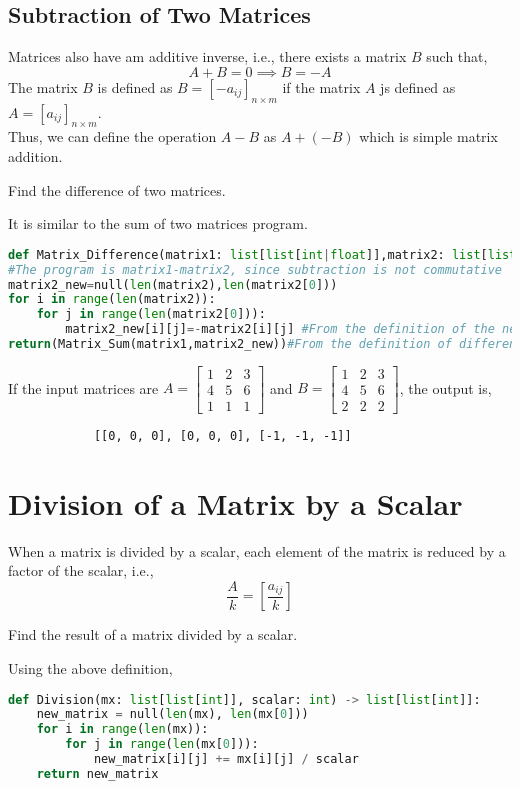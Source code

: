 \subsection{Subtraction of Two Matrices}
Matrices also have am additive inverse, i.e., there exists a matrix $B$ such that,
\[A+B=0\implies B=-A\]
The matrix $B$ is defined as $B=[-a_{ij}]_{n\times m}$ if the matrix $A$ js defined as $A=[a_{ij}]_{n\times m}$.\\
Thus, we can define the operation $A-B$ as $A+(-B)$ which is simple matrix addition.
\begin{eg}
	Find the difference of two matrices.
\end{eg}
\begin{explanation}
	It is similar to the sum of two matrices program.
	\begin{lstlisting}[language=Python, numbers=none]
def Matrix_Difference(matrix1: list[list[int|float]],matrix2: list[list[int|float]]) -> list[list[int|float]]:
#The program is matrix1-matrix2, since subtraction is not commutative
matrix2_new=null(len(matrix2),len(matrix2[0]))
for i in range(len(matrix2)):
	for j in range(len(matrix2[0])):
		matrix2_new[i][j]=-matrix2[i][j] #From the definition of the negative of a matrix
return(Matrix_Sum(matrix1,matrix2_new))#From the definition of difference of two matrices
		\end{lstlisting}
	If the input matrices are $A=\begin{bmatrix}
			1 & 2 & 3 \\
			4 & 5 & 6 \\
			1 & 1 & 1
		\end{bmatrix}$ and $B=\begin{bmatrix}
			1 & 2 & 3 \\
			4 & 5 & 6 \\
			2 & 2 & 2
		\end{bmatrix}$, the output is, \begin{verbatim}
			[[0, 0, 0], [0, 0, 0], [-1, -1, -1]]
		\end{verbatim}
\end{explanation}
\section{Division of a Matrix by a Scalar}
When a matrix is divided by a scalar, each element of the matrix is reduced by a factor of the scalar, i.e.,
\[\frac{A}{k}=\left[\frac{a_{ij}}{k}\right]\]
\begin{eg}
	Find the result of a matrix divided by a scalar.
\end{eg}
\begin{explanation}
	Using the above definition,
	\begin{lstlisting}[language=Python, numbers=none]
def Division(mx: list[list[int]], scalar: int) -> list[list[int]]:
    new_matrix = null(len(mx), len(mx[0]))
    for i in range(len(mx)):
        for j in range(len(mx[0])):
            new_matrix[i][j] += mx[i][j] / scalar
    return new_matrix \end{lstlisting}
\end{explanation}
